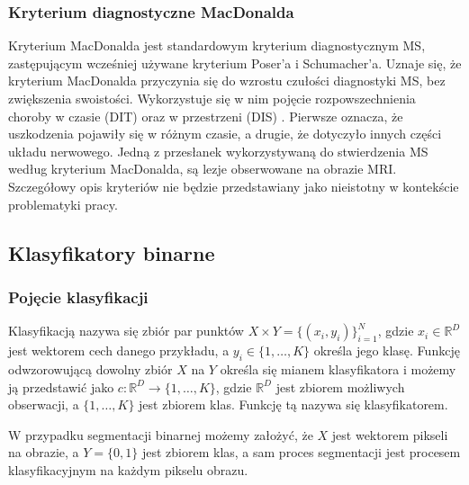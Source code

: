 \subsubsection{Kryterium diagnostyczne MacDonalda}
\label{sec:MSMacDonald}
Kryterium MacDonalda jest standardowym kryterium diagnostycznym MS, zastępującym wcześniej używane kryterium Poser'a i Schumacher'a. Uznaje się, że kryterium MacDonalda przyczynia się do wzrostu czułości diagnostyki MS, bez zwiększenia swoistości\cite{Ntranos2016-yr}. Wykorzystuje się w nim pojęcie rozpowszechnienia choroby w czasie (DIT)  oraz w przestrzeni (DIS) . Pierwsze oznacza, że uszkodzenia pojawiły się w różnym czasie, a drugie, że dotyczyło innych części układu nerwowego. Jedną z przesłanek wykorzystywaną do stwierdzenia MS według kryterium MacDonalda, są lezje obserwowane na obrazie MRI. Szczegółowy opis kryteriów nie będzie przedstawiany jako nieistotny w kontekście problematyki pracy.


\subsection{Klasyfikatory binarne}
\subsubsection{Pojęcie klasyfikacji}
Klasyfikacją nazywa się zbiór par punktów $X \times Y = \{(x_i, y_i)\}^N_{i=1}$, gdzie $x_i \in \mathbb{R}^D$ jest wektorem cech danego przykładu, a $y_i \in \{1, \dots, K\}$ określa jego klasę. Funkcję odwzorowującą dowolny zbiór $X$ na $Y$ określa się mianem klasyfikatora i możemy ją przedstawić jako $c : \mathbb{R}^D \rightarrow \{1, \dots, K\}$, gdzie $\mathbb{R}^D$ jest zbiorem możliwych obserwacji, a $\{1, \dots, K\}$ jest zbiorem klas\cite{matematyk2022-fh}. Funkcję tą nazywa się klasyfikatorem. 
\par 
W przypadku segmentacji binarnej możemy założyć, że $X$ jest wektorem pikseli na obrazie, a $Y = \{0,1\}$ jest zbiorem klas, a sam proces segmentacji jest procesem klasyfikacyjnym na każdym pikselu obrazu. 

